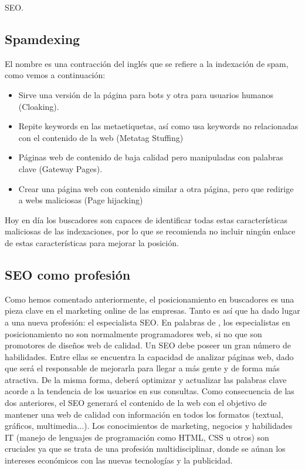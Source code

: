 \begin{section}{SEO.}
		\subsection{Spamdexing}
			El nombre es una contracción del inglés que se refiere a la indexación de spam, como vemos a continuación:
			\begin{itemize}
				\item Sirve una versión de la página para bots y otra para usuarios humanos (Cloaking).
				\item Repite keywords en las metaetiquetas, así como usa keywords no relacionadas con el contenido de la web (Metatag Stuffing)
				\item Páginas web de contenido de baja calidad pero manipuladas con palabras clave (Gateway Pages).
				\item Crear una página web con contenido similar a otra página, pero que redirige a webs maliciosas (Page hijacking)
			\end{itemize}
			
			Hoy en día los buscadores son capaces de identificar todas estas características maliciosas de las indexaciones, por lo que se recomienda no incluir ningún enlace de estas características para mejorar la posición.
	\end{section}
	
	\subsection{SEO como profesión}
		Como hemos comentado anteriormente, el posicionamiento en buscadores es una pieza clave en el marketing online de las empresas. Tanto es así que ha dado lugar a una nueva profesión: el especialista SEO. En palabras de \cite{seo-prof}, los especialistas en posicionamiento no son normalmente programadores web, si no que son promotores de diseños web de calidad. Un SEO debe poseer un gran número de habilidades. Entre ellas se encuentra la capacidad de analizar páginas web, dado que será el responsable de mejorarla para llegar a más gente y de forma más atractiva. De la misma forma, deberá optimizar y actualizar las palabras clave acorde a la tendencia de los usuarios en sus consultas. Como consecuencia de las dos anteriores, el SEO generará el contenido de la web con el objetivo de mantener una web de calidad con información en todos los formatos (textual, gráficos, multimedia...). Los conocimientos de marketing, negocios y habilidades IT (manejo de lenguajes de programación como HTML, CSS u otros) son cruciales ya que se trata de una profesión multidisciplinar, donde se aúnan los intereses económicos con las nuevas tecnologías y la publicidad.
	
